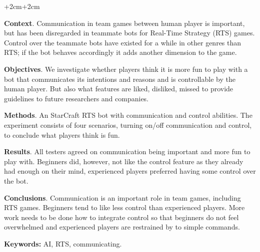 \abstract
\begin{changemargin}{+2cm}{+2cm}
\noindent

\textbf{Context}.
Communication in team games between human player is important, but has been disregarded in teammate bots for Real-Time Strategy (RTS) games. Control over the teammate bots have existed for a while in other genres than RTS; if the bot behaves accordingly it adds another dimension to the game.

\textbf{Objectives}. We investigate whether players think it is more fun to play with a bot that communicates its intentions and reasons and is controllable by the human player. But also what features are liked, disliked, missed to provide guidelines to future researchers and companies.

\textbf{Methods}. An StarCraft RTS bot with communication and control abilities. The experiment consists of four scenarios, turning on/off communication and control, to conclude what players think is fun.

\textbf{Results}. All testers agreed on communication being important and more fun to play with. Beginners did, however, not like the control feature as they already had enough on their mind, experienced players preferred having some control over the bot.

\textbf{Conclusions}. Communication is an important role in team games, including RTS games. Beginners tend to like less control than experienced players. More work needs to be done how to integrate control so that beginners do not feel overwhelmed and experienced players are restrained by to simple commands.

\par\vspace {1cm}
\noindent
\textbf{Keywords:} AI, RTS, communicating.
\end{changemargin}
\clearpage
